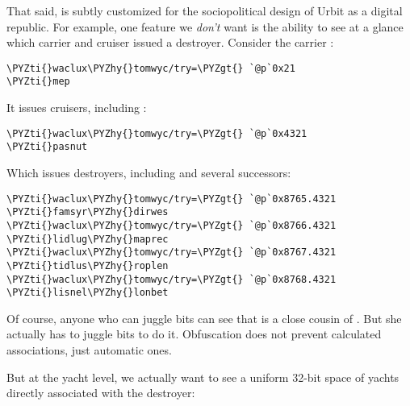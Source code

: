 That said,  is subtly customized for the sociopolitical
design of Urbit as a digital republic.  For example, one feature
we \emph{don't} want is the ability to see at a glance which carrier
and cruiser issued a destroyer.  Consider the carrier :

\begin{framed_shaded}
\begin{Verbatim}[fontsize=\relsize{-2.5},fontseries=b,commandchars=\\\{\}]
\PYZti{}waclux\PYZhy{}tomwyc/try=\PYZgt{} `@p`0x21
\PYZti{}mep
\end{Verbatim}
\end{framed_shaded}

It issues  cruisers, including :

\begin{framed_shaded}
\begin{Verbatim}[fontsize=\relsize{-2.5},fontseries=b,commandchars=\\\{\}]
\PYZti{}waclux\PYZhy{}tomwyc/try=\PYZgt{} `@p`0x4321
\PYZti{}pasnut
\end{Verbatim}
\end{framed_shaded}

Which issues  destroyers, including  and
several successors:

\begin{framed_shaded}
\begin{Verbatim}[fontsize=\relsize{-2.5},fontseries=b,commandchars=\\\{\}]
\PYZti{}waclux\PYZhy{}tomwyc/try=\PYZgt{} `@p`0x8765.4321
\PYZti{}famsyr\PYZhy{}dirwes
\PYZti{}waclux\PYZhy{}tomwyc/try=\PYZgt{} `@p`0x8766.4321
\PYZti{}lidlug\PYZhy{}maprec
\PYZti{}waclux\PYZhy{}tomwyc/try=\PYZgt{} `@p`0x8767.4321
\PYZti{}tidlus\PYZhy{}roplen
\PYZti{}waclux\PYZhy{}tomwyc/try=\PYZgt{} `@p`0x8768.4321
\PYZti{}lisnel\PYZhy{}lonbet
\end{Verbatim}
\end{framed_shaded}

Of course, anyone who can juggle bits can see that
 is a close cousin of .  But she
actually has to juggle bits to do it.  Obfuscation does not
prevent calculated associations, just automatic ones.

But at the yacht level, we actually want to see a uniform 32-bit
space of yachts directly associated with the destroyer:

